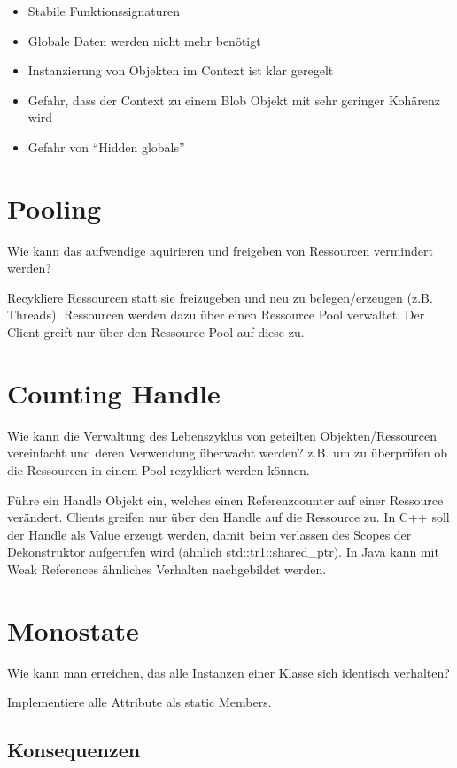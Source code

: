 \begin{itemize}
	\item Stabile Funktionssignaturen
	\item Globale Daten werden nicht mehr benötigt
	\item Instanzierung von Objekten im Context ist klar geregelt
	\item Gefahr, dass der Context zu einem Blob Objekt mit sehr geringer Kohärenz wird
	\item Gefahr von ``Hidden globals''
\end{itemize}


\section{Pooling}

Wie kann das aufwendige aquirieren und freigeben von Ressourcen vermindert werden?

Recykliere Ressourcen statt sie freizugeben und neu zu belegen/erzeugen (z.B. Threads). Ressourcen werden dazu über einen Ressource Pool verwaltet. Der Client greift nur über den Ressource Pool auf diese zu.

\section{Counting Handle}

Wie kann die Verwaltung des Lebenszyklus von geteilten Objekten/Ressourcen vereinfacht und deren Verwendung überwacht werden? z.B. um zu überprüfen ob die Ressourcen in einem Pool rezykliert werden können.

Führe ein Handle Objekt ein, welches einen Referenzcounter auf einer Ressource verändert. Clients greifen nur über den Handle auf die Ressource zu. In C++ soll der Handle als Value erzeugt werden, damit beim verlassen des Scopes der Dekonstruktor aufgerufen wird (ähnlich std::tr1::shared\_ptr). In Java kann mit Weak References ähnliches Verhalten nachgebildet werden.

\section{Monostate}

Wie kann man erreichen, das alle Instanzen einer Klasse sich identisch verhalten?

Implementiere alle Attribute als static Members.

\subsection*{Konsequenzen}

